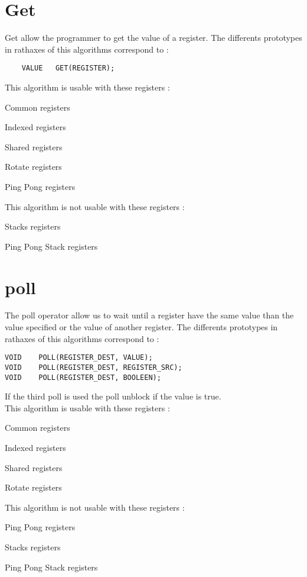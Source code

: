 \documentclass[11pt]{report}
\begin{document}
\section{Get}
Get allow the programmer to get the value of a register. The differents prototypes 
in rathaxes of this algorithms correspond to :
\begin{lstlisting}
	VALUE	GET(REGISTER);
\end{lstlisting}
This algorithm is usable with these registers : 
\begin{description}
	\item{Common registers}
	\item{Indexed registers}
	\item{Shared registers}
	\item{Rotate registers}
	\item{Ping Pong registers}
\end{description}
This algorithm is not usable with these registers : 
\begin{description}
	\item{Stacks registers}
	\item{Ping Pong Stack registers}
\end{description}

\section{poll}
The poll operator allow us to wait until a register have the same value than 
the value specified or the value of another register. The differents prototypes 
in rathaxes of this algorithms correspond to :
\begin{lstlisting}
VOID	POLL(REGISTER_DEST, VALUE);
VOID	POLL(REGISTER_DEST, REGISTER_SRC);
VOID	POLL(REGISTER_DEST, BOOLEEN);
\end{lstlisting}
If the third poll is used the poll unblock if the value is true.\\
This algorithm is usable with these registers : 
\begin{description}
	\item{Common registers}
	\item{Indexed registers}
	\item{Shared registers}
	\item{Rotate registers}
\end{description}
This algorithm is not usable with these registers : 
\begin{description}
	\item{Ping Pong registers}
	\item{Stacks registers}
	\item{Ping Pong Stack registers}
\end{description}
\end{document}
